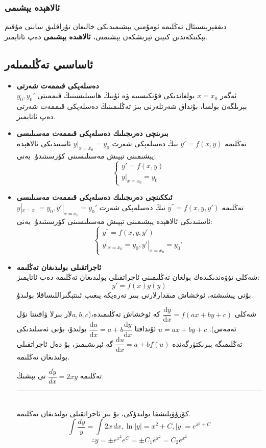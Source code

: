 \subsubsection{ئالاھېدە يېشىمى}
دىففېرېنسىئال تەڭلىمە ئومۇمىي يېشىمىدىكى خالىغان تۇراقلىق ساننى مۇقىم بېكىتكەندىن كىيىن ئېرىشكەن يېشىمنى، \textbf{ئالاھىدە يېشىمى} دەپ ئاتايمىز.

\subsection{ئاساسىي تەڭلىمىلەر}
\begin{itemize}
\item \textbf{دەسلەپكى قىممەت شەرتى}\\
ئەگەر $x=x_0$ بولغاندىكى فۇنكىسىيە ۋە ئۇنىڭ ھاسىلىسىنىڭ قىممىتى
 $y_0,y_{0}'$ بېرىلگەن بولسا، بۇنداق شەرتلەرنى بىز تەڭلىمىنىڭ دەسلەپكى قىممەت شەرتى دەپ ئاتايمىز.
\item \textbf{بىرىنچى دەرىجىلىك دەسلەپكى قىممەت مەسىلىسى}\\
تەڭلىمە $y'=f(x,y)$ نىڭ دەسلەپكى شەرت $y|_{x=x_0}=y_0$ ئاستىدىكى ئالاھېدە يېشىمىنى تېپىش مەسىلىسىنى كۆرسىتىدۇ. يەنى:
$$
\left\{\begin{array}{l}
y' = f(x,y) \\
y|_{x=x_0}=y_0
\end{array}\right.
$$

\item \textbf{ئىككىنچى دەرىجىلىك دەسلەپكى قىممەت مەسىلىسى}\\
تەڭلىمە $y^{''}=f(x,y,y')$ نىڭ دەسلەپكى شەرت 
$y|_{x=x_0}=y_0, y'|_{x=x_0}=y_{0}'$
 ئاستىدىكى ئالاھېدە يېشىمىنى تېپىش مەسىلىسىنى كۆرسىتىدۇ. يەنى:
$$
\left\{\begin{array}{l}
y^{''}=f(x,y,y') \\
y|_{x=x_0}=y_0, y'|_{x=x_0}=y_{0}'
\end{array}\right.
$$
\item \textbf{ئاجراتقىلى بولىدىغان تەڭلىمە}\\
شەكلى تۆۋەندىكىدەك بولغان تەڭلىمىنى ئاجراتقىلى بولىدىغان تەڭلىمە دەپ ئاتايمىز:
$$y'=f(x)g(y)$$
بۇنى يېشىشتە، ئوخشاش مىقدارلارنى بىىر تەرەپكە يىغىپ ئىنتېگىراللىساقلا بولىدۇ.
\begin{colorful}[green]
شەكلى
$\dfrac{\textrm{d}y}{\textrm{d}x}=f(ax+by+c)$
كە ئوخشاش تەڭلىمىدە،($a,b,c$لار بىرلا ۋاقىتتا نۆل ئەمەس).
$u=ax+by+c$
ئۇنداقتا
$\dfrac{\textrm{d}u}{\text{d}x}=a+b\dfrac{\textrm{d}y}{\textrm{d}x}$
بولىدۇ، بۇنى ئەسلىدىكى تەڭلىمىگە بېرىكتۈرگەندە 
$\dfrac{\textrm{d}u}{\textrm{d}x}=a+bf(u)$
گە ئېرىشىمىز، بۇ دەل ئاجراتقىلى بولىدىغان تەڭلىمە.
\end{colorful}
\begin{myexample}
	تەڭلىمە
	$\dfrac{dy}{dx}=2xy$
	نى يېشىڭ.
	\\\rule{\linewidth}{0.05em}\\
	كۆرۈۋېلىشقا بولىدۇكى، بۇ بىر ئاجراتقىلى بولىدىغان تەڭلىمە.\\
	$$\displaystyle{\int\dfrac{dy}{y}}=\int2x\,dx, \ln\vert y\vert=x^2+C, \vert y\vert=e^{x^2+C}$$
	$$\therefore y=\pm e^{x^2}e^C=\pm C_1e^{x^2}=C_2e^{x^2}$$
\end{myexample}


\end{itemize}
